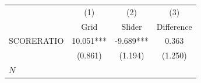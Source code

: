 {
\def\sym#1{\ifmmode^{#1}\else\(^{#1}\)\fi}
\begin{tabular}{l*{3}{c}}
\hline\hline
            &\multicolumn{1}{c}{(1)}&\multicolumn{1}{c}{(2)}&\multicolumn{1}{c}{(3)}\\
            &\multicolumn{1}{c}{Grid}&\multicolumn{1}{c}{Slider}&\multicolumn{1}{c}{Difference}\\
\hline
SCORERATIO  &      10.051***&      -9.689***&       0.363   \\
            &     (0.861)   &     (1.194)   &     (1.250)   \\
\hline
\(N\)       &               &               &               \\
\hline\hline
\end{tabular}
}
